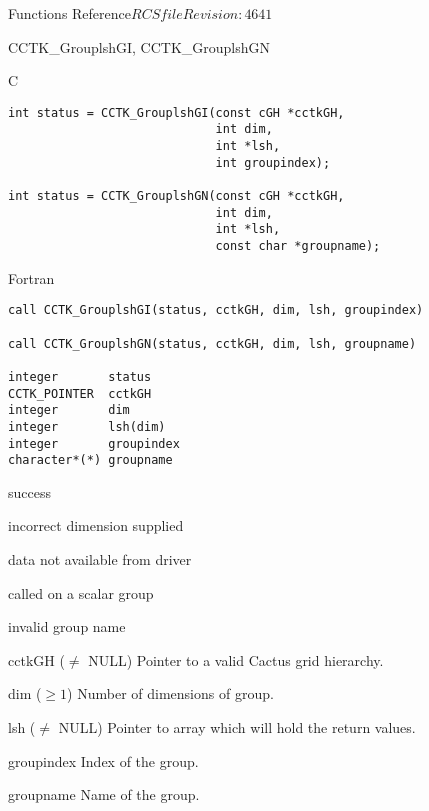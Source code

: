 \begin{cactuspart}{ Functions Reference}{$RCSfile$}{$Revision: 4641 $}
\begin{FunctionDescription}{CCTK\_GrouplshGI, CCTK\_GrouplshGN}
\begin{SynopsisSection}
\begin{Synopsis}{C}
\begin{verbatim}
int status = CCTK_GrouplshGI(const cGH *cctkGH,
                             int dim,
                             int *lsh,
                             int groupindex);

int status = CCTK_GrouplshGN(const cGH *cctkGH,
                             int dim,
                             int *lsh,
                             const char *groupname);
\end{verbatim}
\end{Synopsis}
\begin{Synopsis}{Fortran}
\begin{verbatim}
call CCTK_GrouplshGI(status, cctkGH, dim, lsh, groupindex)

call CCTK_GrouplshGN(status, cctkGH, dim, lsh, groupname)

integer       status
CCTK_POINTER  cctkGH
integer       dim
integer       lsh(dim)
integer       groupindex
character*(*) groupname
\end{verbatim}
\end{Synopsis}
\end{SynopsisSection}

\begin{ResultSection}
\begin{Result}{0} success \end{Result}
\begin{Result}{-1} incorrect dimension supplied \end{Result}
\begin{Result}{-2} data not available from driver \end{Result}
\begin{Result}{-3} called on a scalar group \end{Result}
\begin{Result}{-4} invalid group name \end{Result}
\end{ResultSection}

\begin{ParameterSection}
\begin{Parameter}{cctkGH ($\ne$ NULL)} Pointer to a valid Cactus grid hierarchy. \end{Parameter}
\begin{Parameter}{dim ($\ge 1$)} Number of dimensions of group. \end{Parameter}
\begin{Parameter}{lsh ($\ne$ NULL)} Pointer to array which will hold the return values. \end{Parameter}
\begin{Parameter}{groupindex} Index of the group. \end{Parameter}
\begin{Parameter}{groupname} Name of the group. \end{Parameter}
\end{ParameterSection}


\end{FunctionDescription}
\end{cactuspart}
